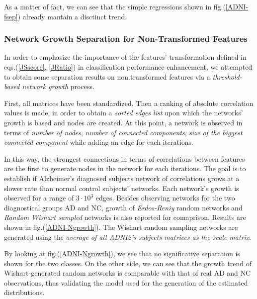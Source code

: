 \documentclass[12pt,openright,twoside,a4paper]{book}
\begin{document}
As a matter of fact, we can see that the simple regressions shown in fig.(\ref{ADNI-fsep}) already mantain a disctinct trend.

\subsubsection*{Network Growth Separation for Non-Transformed Features}

In order to emphasize the importance of the features' transformation defined in eqs.(\ref{JSscore}, \ref{JRatio}) in classification performance enhancement, we attempted to obtain some separation results on non.transformed features via a \textit{threshold-based network growth} process.

First, all matrices have been standardized. Then a ranking of absolute correlation values is made, in order to obtain a \textit{sorted edges list} upon which the networks' growth is based and nodes are created.
At this point, a network is observed in terms of \textit{number of nodes}, \textit{number of connected components}, \textit{size of the biggest connected component} while adding an edge for each iterations. 

In this way, the strongest connections in terms of correlations between features are the first to generate nodes in the network for each iterations. The goal is to establish if Alzheimer's diagnosed subjects network of correlations grows at a slower rate than normal control subjects' networks.
Each network's growth is observed for a range of $3\cdot 10^3$ edges.
Besides observing networks for the two diagnostical groups AD and NC,  growth of \textit{Erdos-Reniy} random networks and \textit{Random Wishart sampled} networks is also reported for comaprison. Results are shown in fig.(\ref{ADNI-Ngrowth}).
The Wishart random sampling networks are generated using the \textit{average of all ADNI2's subjects matrices as the scale matrix}.

By looking at fig.(\ref{ADNI-Ngrowth}), we see that no significative separation is shown for the two classes.
On the other side, we can see that the growth trend of Wishart-generated random networks is comparable with that of real AD and NC observations, thus validating the model used for the generation of the estimated distributions.
\end{document}
